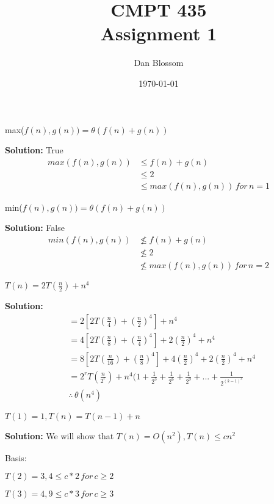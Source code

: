 \documentclass[12pt]{article}
\title{CMPT 435\\Assignment 1}
\author{Dan Blossom}
\date{\today}
\begin{document}
\maketitle
\begin{description}
\smallskip
\item[Problem 1A] max(\(f(n), g(n)) = \theta (f(n) + g(n)) \)
\smallskip

\textbf{Solution:} True
\begin{align*}
max(f(n), g(n)) & \leq f(n) + g(n) \\
                & \leq 2 \\
                & \leq max(f(n), g(n))\, for\, n = 1
\end{align*}
\smallskip
\item[Problem 1B] min(\(f(n), g(n)) = \theta (f(n) + g(n)) \)
\smallskip

\textbf{Solution:} False
\begin{align*}
min(f(n), g(n)) & \nleq f(n) + g(n) \\
                & \nleq 2 \\
                & \nleq max(f(n), g(n))\, for\, n = 2
\end{align*}
\smallskip
\item[Problem 2] \( T(n) = 2T(\frac{n}{2}) + n^4 \)
\smallskip

\textbf{Solution:}
\begin{align*}
    & = 2[2T(\frac{n}{4}) + (\frac{n}{2})^4] + n^4 \\
    & = 4[2T(\frac{n}{8}) + (\frac{n}{4})^4] + 2(\frac{n}{2})^4 + n^4 \\
    & = 8[2T(\frac{n}{16}) + (\frac{n}{8})^4] + 4(\frac{n}{2})^4 + 2(\frac{n}{2})^4 + n^4 \\
    & = 2^r T(\frac{n}{2^r}) + n^4(1 + \frac{1}{2^3} + \frac{1}{2^6} + \frac{1}{2^9} + ... + \frac{1}{2^{(k-1)^3}} \\
    & \therefore\, \theta(n^4)
\end{align*}
\smallskip
\item[Problem 3A] \( T(1) = 1, T(n) = T(n - 1) + n \)
\smallskip

\textbf{Solution:}
We will show that \( T(n) = O(n^2), T(n) \leq cn^2 \)

Basis:

\setlength{\parindent}{1cm} \( T(2) = 3, 4 \leq c*2\, for\, c \geq 2 \)

\setlength{\parindent}{1cm} \( T(3) = 4, 9 \leq c*3\, for\, c \geq 3 \)


\end{description}
\end{document}
